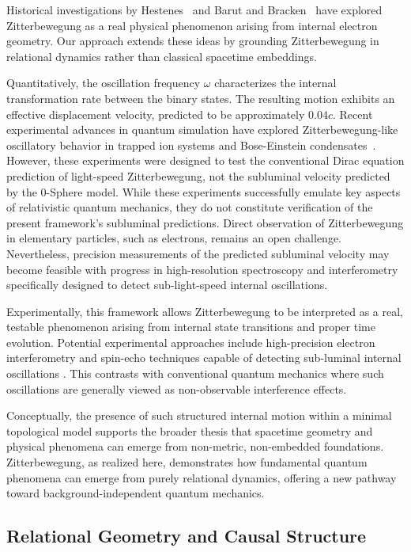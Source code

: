 \documentclass[%
 reprint,
 amsmath,amssymb,
 aps,
]{revtex4-1}
\numberwithin{equation}{section}%
\begin{document}
Historical investigations by Hestenes~\cite{hestenes1990} and Barut and Bracken~\cite{barut1981} have explored Zitterbewegung as a real physical phenomenon arising from internal electron geometry. Our approach extends these ideas by grounding Zitterbewegung in relational dynamics rather than classical spacetime embeddings.

Quantitatively, the oscillation frequency $\omega$ characterizes the internal transformation rate between the binary states. The resulting motion exhibits an effective displacement velocity, predicted to be approximately $0.04c$\cite{hanamura2309.0047}. Recent experimental advances in quantum simulation have explored Zitterbewegung-like oscillatory behavior in trapped ion systems\cite{gerritsma2010} and Bose-Einstein condensates~\cite{leblanc2013}. However, these experiments were designed to test the conventional Dirac equation prediction of light-speed Zitterbewegung, not the subluminal velocity predicted by the 0-Sphere model. While these experiments successfully emulate key aspects of relativistic quantum mechanics, they do not constitute verification of the present framework's subluminal predictions. Direct observation of Zitterbewegung in elementary particles, such as electrons, remains an open challenge. Nevertheless, precision measurements of the predicted subluminal velocity may become feasible with progress in high-resolution spectroscopy and interferometry specifically designed to detect sub-light-speed internal oscillations.

Experimentally, this framework allows Zitterbewegung to be interpreted as a real, testable phenomenon arising from internal state transitions and proper time evolution. Potential experimental approaches include high-precision electron interferometry and spin-echo techniques capable of detecting sub-luminal internal oscillations \cite{gerritsma2010, leblanc2013}. This contrasts with conventional quantum mechanics where such oscillations are generally viewed as non-observable interference effects.

Conceptually, the presence of such structured internal motion within a minimal topological model supports the broader thesis that spacetime geometry and physical phenomena can emerge from non-metric, non-embedded foundations. Zitterbewegung, as realized here, demonstrates how fundamental quantum phenomena can emerge from purely relational dynamics, offering a new pathway toward background-independent quantum mechanics.

\subsection{Relational Geometry and Causal Structure}
\label{subsec:relational_geometry}
\end{document}
